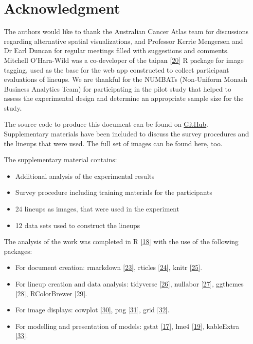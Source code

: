 \documentclass[conference,final,]{IEEEtran}
\providecommand{\tightlist}{%
  \setlength{\itemsep}{0pt}\setlength{\parskip}{0pt}}
\begin{document}
\hypertarget{acknowledgment}{%
\section{Acknowledgment}\label{acknowledgment}}

The authors would like to thank the Australian Cancer Atlas team for discussions regarding alternative spatial visualizations, and Professor Kerrie Mengersen and Dr Earl Duncan for regular meetings filled with suggestions and comments. Mitchell O'Hara-Wild was a co-developer of the taipan {[}\protect\hyperlink{ref-taipan}{20}{]} R package for image tagging, used as the base for the web app constructed to collect participant evaluations of lineups. We are thankful for the NUMBATs (Non-Uniform Monash Business Analytics Team) for participating in the pilot study that helped to assess the experimental design and determine an appropriate sample size for the study.

The source code to produce this document can be found on \href{https://github.com/srkobakian/experiment/paper}{GitHub}.
Supplementary materials have been included to discuss the survey procedures and the lineups that were used.
The full set of images can be found here, too.

The supplementary material contains:

\begin{itemize}
\tightlist
\item
  Additional analysis of the experimental results
\item
  Survey procedure including training materials for the participants
\item
  24 lineups as images, that were used in the experiment
\item
  12 data sets used to construct the lineups
\end{itemize}

The analysis of the work was completed in R {[}\protect\hyperlink{ref-RCore}{18}{]} with the use of the following packages:

\begin{itemize}
\tightlist
\item
  For document creation: rmarkdown {[}\protect\hyperlink{ref-rmarkdown}{23}{]}, rticles {[}\protect\hyperlink{ref-rticles}{24}{]}, knitr {[}\protect\hyperlink{ref-knitr}{25}{]}.
\item
  For lineup creation and data analysis: tidyverse {[}\protect\hyperlink{ref-tidyverse}{26}{]}, nullabor {[}\protect\hyperlink{ref-nullabor}{27}{]}, ggthemes {[}\protect\hyperlink{ref-ggthemes}{28}{]}, RColorBrewer {[}\protect\hyperlink{ref-RColorBrewer}{29}{]}.
\item
  For image displays: cowplot {[}\protect\hyperlink{ref-cowplot}{30}{]}, png {[}\protect\hyperlink{ref-png}{31}{]}, grid {[}\protect\hyperlink{ref-grid}{32}{]}.
\item
  For modelling and presentation of models: gstat {[}\protect\hyperlink{ref-gstat}{17}{]}, lme4 {[}\protect\hyperlink{ref-lme4}{19}{]}, kableExtra {[}\protect\hyperlink{ref-kableExtra}{33}{]}.
\end{itemize}
\end{document}

